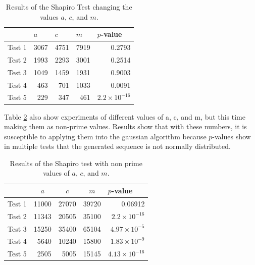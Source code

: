 \documentclass[10pt,leter,openany]{article}
\begin{document}
			\begin{table}[]
				\centering
				\caption{Results of the Shapiro Test changing the values $a$, $c$, and $m$.}
				\label{tab:muller_acm}
				\begin{tabular}{@{}lrrrr@{}}
					\toprule
					& \multicolumn{1}{l}{$ a $} & \multicolumn{1}{l}{$ c $} & \multicolumn{1}{l}{$ m $} & \multicolumn{1}{l}{$ p $-value} \\ \midrule
					Test 1  & 3067                  & 4751                  & 7919                  & 0.2793                      \\
					Test 2 & 1993                  & 2293                  & 3001                  & 0.2514                      \\
					Test 3 & 1049                  & 1459                  & 1931                  & 0.9003                      \\
					Test 4 & 463                   & 701                   & 1033                  & 0.0091                      \\
					Test 5 & 229                   & 347                   & 461                   & $ 2.2\times 10^{-16} $                     \\ \bottomrule
				\end{tabular}
			\end{table}

		Table \ref{tab:muller_nonprime} also show experiments of different values of a, c, and m, but this time making them as non-prime values. Results show that with these numbers, it is susceptible to applying them into the gaussian algorithm because $p$-values show in multiple tests that the generated sequence is not normally distributed. 


			\begin{table}[]
				\centering
				\caption{Results of the Shapiro test with non prime values of $a$, $ c$, and $m$.}
				\label{tab:muller_nonprime}
				\begin{tabular}{@{}lrrrr@{}}
					\toprule
					& \multicolumn{1}{c}{$ a $} & \multicolumn{1}{c}{$ c $} & \multicolumn{1}{c}{$ m $} & \multicolumn{1}{l}{$ p $-value} \\ \midrule
					Test 1  & 11000                 & 27070                 & 39720                 & 0.06912                     \\
					Test 2 & 11343                 & 20505                 & 35100                 & $ 2.2 \times 10^{-16}   $                   \\
					Test 3 & 15250                 & 35400                 & 65104                 & $ 4.97\times 10^{-5} $                   \\
					Test 4 & 5640                  & 10240                 & 15800                 & $ 1.83 \times 10^{-9}  $                  \\
					Test 5 & 2505                  & 5005                  & 15145                 & $ 4.13\times 10^{-16}    $                 \\ \bottomrule
				\end{tabular}
			\end{table}
\end{document}
